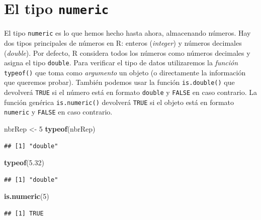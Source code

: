 \documentclass[
]{book}
\newenvironment{Shaded}{\begin{snugshade}}{\end{snugshade}}
\newcommand{\DecValTok}[1]{\textcolor[rgb]{0.00,0.00,0.81}{#1}}
\newcommand{\FloatTok}[1]{\textcolor[rgb]{0.00,0.00,0.81}{#1}}
\newcommand{\KeywordTok}[1]{\textcolor[rgb]{0.13,0.29,0.53}{\textbf{#1}}}
\newcommand{\NormalTok}[1]{#1}
\newcommand{\StringTok}[1]{\textcolor[rgb]{0.31,0.60,0.02}{#1}}
\begin{document}
\hypertarget{el-tipo-numeric}{%
\section{\texorpdfstring{El tipo \texttt{numeric}}{El tipo numeric}}\label{el-tipo-numeric}}

El tipo \texttt{numeric} es lo que hemos hecho hasta ahora, almacenando números. Hay dos tipos principales de números en R: enteros (\emph{integer}) y números decimales (\emph{double}). Por defecto, R considera todos los números como números decimales y asigna el tipo \texttt{double}.
Para verificar el tipo de datos utilizaremos la \emph{función} \texttt{typeof()} que toma como \emph{argumento} un objeto (o directamente la información que queremos probar). También podemos usar la función \texttt{is.double()} que devolverá \texttt{TRUE} si el número está en formato \texttt{double} y \texttt{FALSE} en caso contrario. La función genérica \texttt{is.numeric()} devolverá \texttt{TRUE} si el objeto está en formato \texttt{numeric} y \texttt{FALSE} en caso contrario.

\begin{Shaded}
\begin{Highlighting}[]
\NormalTok{nbrRep <-}\StringTok{ }\DecValTok{5}
\KeywordTok{typeof}\NormalTok{(nbrRep)}
\end{Highlighting}
\end{Shaded}

\begin{verbatim}
## [1] "double"
\end{verbatim}

\begin{Shaded}
\begin{Highlighting}[]
\KeywordTok{typeof}\NormalTok{(}\FloatTok{5.32}\NormalTok{)}
\end{Highlighting}
\end{Shaded}

\begin{verbatim}
## [1] "double"
\end{verbatim}

\begin{Shaded}
\begin{Highlighting}[]
\KeywordTok{is.numeric}\NormalTok{(}\DecValTok{5}\NormalTok{)}
\end{Highlighting}
\end{Shaded}

\begin{verbatim}
## [1] TRUE
\end{verbatim}
\end{document}
